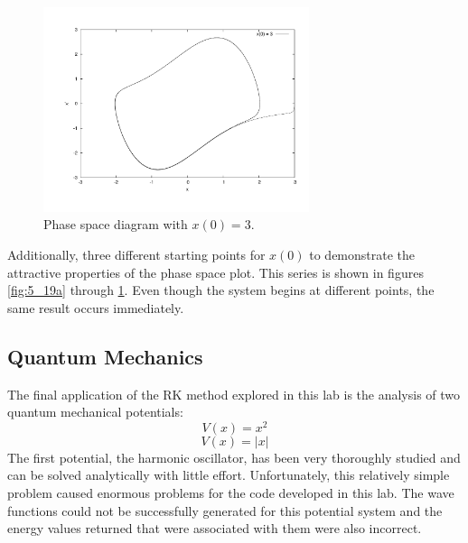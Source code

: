 \documentclass[12pt]{article}
\begin{document}
\begin{figure}[!h]
\centering
\includegraphics[width =110 mm, height = 60mm]{Ex_5_19_3.pdf}
\caption{Phase space diagram with $x(0)=3$.}
\label{fig:5_19c}
\end{figure}

Additionally, three different starting points for $x(0)$ to demonstrate the attractive properties of the phase space plot.  This series is shown in figures \ref{fig:5_19a} through \ref{fig:5_19c}.  Even though the system begins at different points, the same result occurs immediately.
\pagebreak
\subsection{Quantum Mechanics}
The final application of the RK method explored in this lab is the analysis of two quantum mechanical potentials:
\begin{equation}
\label{v1}
V(x)=x^2
\end{equation}
\begin{equation}
\label{v2}
V(x)=|x|
\end{equation}
The first potential, the harmonic oscillator, has been very thoroughly studied and can be solved analytically with little effort.  Unfortunately, this relatively simple problem caused enormous problems for the code developed in this lab.  The wave functions could not be successfully generated for this potential system and the energy values returned that were associated with them were also incorrect.
\end{document}
